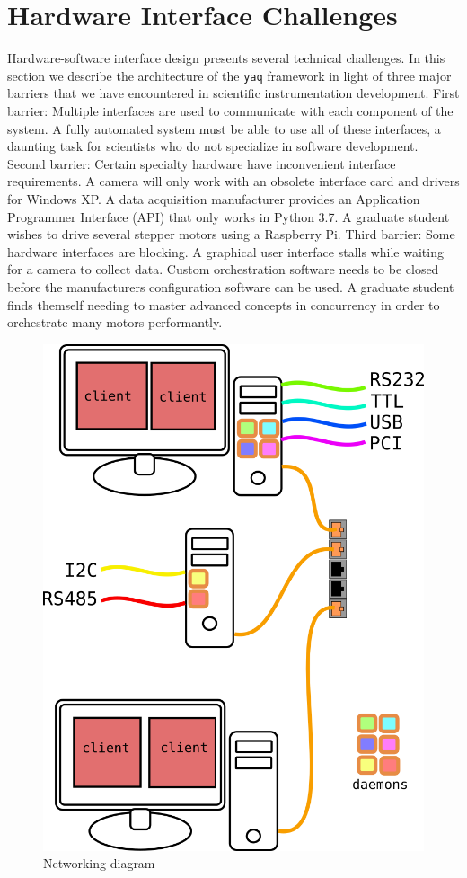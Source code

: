 \documentclass[aip, amsmath, amssymb, reprint,]{revtex4-1}
\newcommand\yaq{\texttt{yaq}}
\begin{document}
\section{Hardware Interface Challenges}

Hardware-software interface design presents several technical challenges.
In this section we describe the architecture of the \yaq{} framework in light of three major barriers that we have encountered in scientific instrumentation development.
First barrier: Multiple interfaces are used to communicate with each component of the system.
A fully automated system must be able to use all of these interfaces, a daunting task for scientists who do not specialize in software development.
Second barrier: Certain specialty hardware have inconvenient interface requirements.
A camera will only work with an obsolete interface card and drivers for Windows XP.
A data acquisition manufacturer provides an Application Programmer Interface (API) that only works in Python 3.7.
A graduate student wishes to drive several stepper motors using a Raspberry Pi.
Third barrier: Some hardware interfaces are blocking.
A graphical user interface stalls while waiting for a camera to collect data.
Custom orchestration software needs to be closed before the manufacturers configuration software can be used.
A graduate student finds themself needing to master advanced concepts in concurrency in order to orchestrate many motors performantly.

\begin{figure}
	\includegraphics[width=\columnwidth]{figures/network}
\caption{\label{fig:network} Networking diagram}
\end{figure}
\end{document}
